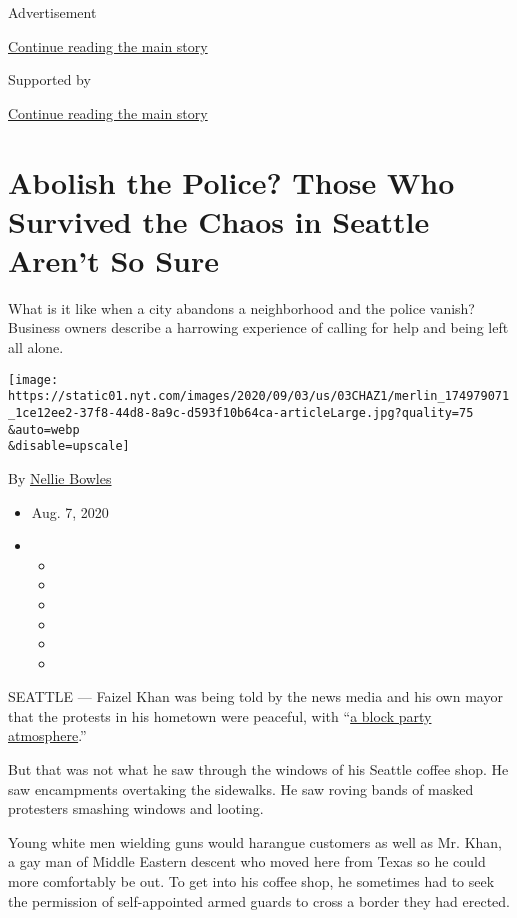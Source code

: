 Advertisement

\protect\hyperlink{after-top}{Continue reading the main story}

Supported by

\protect\hyperlink{after-sponsor}{Continue reading the main story}

\hypertarget{abolish-the-police-those-who-survived-the-chaos-in-seattle-arent-so-sure}{%
\section{Abolish the Police? Those Who Survived the Chaos in Seattle
Aren't So
Sure}\label{abolish-the-police-those-who-survived-the-chaos-in-seattle-arent-so-sure}}

What is it like when a city abandons a neighborhood and the police
vanish? Business owners describe a harrowing experience of calling for
help and being left all alone.

\texttt{[image: https://static01.nyt.com/images/2020/09/03/us/03CHAZ1/merlin\_174979071\_1ce12ee2-37f8-44d8-8a9c-d593f10b64ca-articleLarge.jpg?quality=75\\\&auto=webp\\\&disable=upscale]}

By \href{https://www.nytimes.com/by/nellie-bowles}{Nellie Bowles}

\begin{itemize}
\item
  Aug. 7, 2020
\item
  \begin{itemize}
  \item
  \item
  \item
  \item
  \item
  \item
  \end{itemize}
\end{itemize}

SEATTLE --- Faizel Khan was being told by the news media and his own
mayor that the protests in his hometown were peaceful, with
``\href{https://www.realclearpolitics.com/video/2020/06/12/seattle_mayor_durkan_chaz_has_a_block_party_atmosphere_could_turn_into_summer_of_love.html}{a
block party atmosphere}.''

But that was not what he saw through the windows of his Seattle coffee
shop. He saw encampments overtaking the sidewalks. He saw roving bands
of masked protesters smashing windows and looting.

Young white men wielding guns would harangue customers as well as Mr.
Khan, a gay man of Middle Eastern descent who moved here from Texas so
he could more comfortably be out. To get into his coffee shop, he
sometimes had to seek the permission of self-appointed armed guards to
cross a border they had erected.


